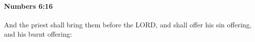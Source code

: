 
		\paragraph{Numbers 6:16} %
			\label{NUMBERS-6-16}

			And the priest shall bring them before the LORD, and shall offer his sin offering, and his burnt offering:



